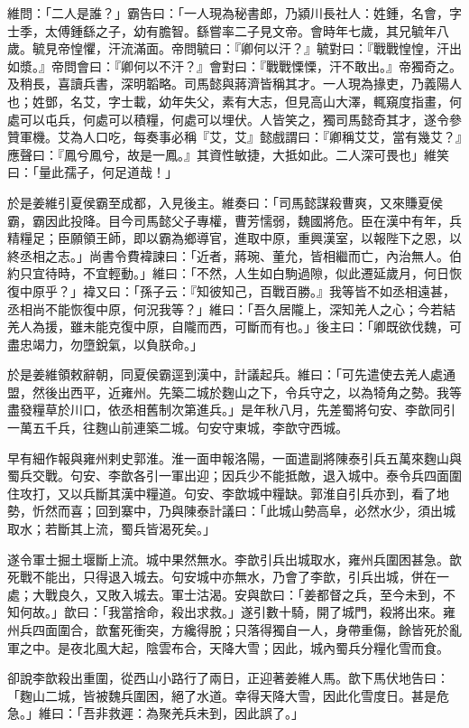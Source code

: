 維問：「二人是誰？」霸告曰：「一人現為秘書郎，乃潁川長社人：姓鍾，名會，字士季，太傅鍾繇之子，幼有膽智。繇嘗率二子見文帝。會時年七歲，其兄毓年八歲。毓見帝惶懼，汗流滿面。帝問毓曰：『卿何以汗？』毓對曰：『戰戰惶惶，汗出如漿。』帝問會曰：『卿何以不汗？』會對曰：『戰戰慄慄，汗不敢出。』帝獨奇之。及稍長，喜讀兵書，深明韜略。司馬懿與蔣濟皆稱其才。一人現為掾吏，乃義陽人也；姓鄧，名艾，字士載，幼年失父，素有大志，但見高山大澤，輒窺度指畫，何處可以屯兵，何處可以積糧，何處可以埋伏。人皆笑之，獨司馬懿奇其才，遂令參贊軍機。艾為人口吃，每奏事必稱『艾，艾』懿戲謂曰：『卿稱艾艾，當有幾艾？』應聲曰：『鳳兮鳳兮，故是一鳳。』其資性敏捷，大抵如此。二人深可畏也」維笑曰：「量此孺子，何足道哉！」

於是姜維引夏侯霸至成都，入見後主。維奏曰：「司馬懿謀殺曹爽，又來賺夏侯霸，霸因此投降。目今司馬懿父子專權，曹芳懦弱，魏國將危。臣在漢中有年，兵精糧足；臣願領王師，即以霸為鄉導官，進取中原，重興漢室，以報陛下之恩，以終丞相之志。」尚書令費褘諫曰：「近者，蔣琬、董允，皆相繼而亡，內治無人。伯約只宜待時，不宜輕動。」維曰：「不然，人生如白駒過隙，似此遷延歲月，何日恢復中原乎？」褘又曰：「孫子云：『知彼知己，百戰百勝。』我等皆不如丞相遠甚，丞相尚不能恢復中原，何況我等？」維曰：「吾久居隴上，深知羌人之心；今若結羌人為援，雖未能克復中原，自隴而西，可斷而有也。」後主曰：「卿既欲伐魏，可盡忠竭力，勿墮銳氣，以負朕命。」

於是姜維領敕辭朝，同夏侯霸逕到漢中，計議起兵。維曰：「可先遣使去羌人處通盟，然後出西平，近雍州。先築二城於麴山之下，令兵守之，以為犄角之勢。我等盡發糧草於川口，依丞相舊制次第進兵。」是年秋八月，先差蜀將句安、李歆同引一萬五千兵，往麴山前連築二城。句安守東城，李歆守西城。

早有細作報與雍州剌史郭淮。淮一面申報洛陽，一面遣副將陳泰引兵五萬來麴山與蜀兵交戰。句安、李歆各引一軍出迎；因兵少不能抵敵，退入城中。泰令兵四面圍住攻打，又以兵斷其漢中糧道。句安、李歆城中糧缺。郭淮自引兵亦到，看了地勢，忻然而喜；回到寨中，乃與陳泰計議曰：「此城山勢高阜，必然水少，須出城取水；若斷其上流，蜀兵皆渴死矣。」

遂令軍士掘土堰斷上流。城中果然無水。李歆引兵出城取水，雍州兵圍困甚急。歆死戰不能出，只得退入城去。句安城中亦無水，乃會了李歆，引兵出城，併在一處；大戰良久，又敗入城去。軍士沽渴。安與歆曰：「姜都督之兵，至今未到，不知何故。」歆曰：「我當捨命，殺出求救。」遂引數十騎，開了城門，殺將出來。雍州兵四面圍合，歆奮死衝突，方纔得脫；只落得獨自一人，身帶重傷，餘皆死於亂軍之中。是夜北風大起，陰雲布合，天降大雪；因此，城內蜀兵分糧化雪而食。

卻說李歆殺出重圍，從西山小路行了兩日，正迎著姜維人馬。歆下馬伏地告曰：「麴山二城，皆被魏兵圍困，絕了水道。幸得天降大雪，因此化雪度日。甚是危急。」維曰：「吾非救遲：為聚羌兵未到，因此誤了。」

